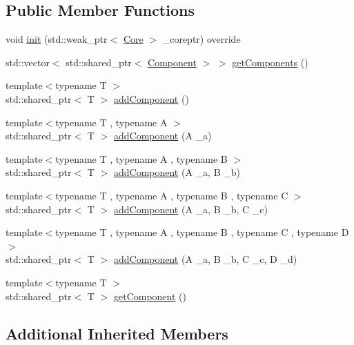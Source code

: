 \subsection*{Public Member Functions}
\begin{DoxyCompactItemize}
\item 
void \hyperlink{classfrontier_1_1_prefab_a6f41f76c2c8484ba9d4451a936f43e42}{init} (std\+::weak\+\_\+ptr$<$ \hyperlink{classfrontier_1_1_core}{Core} $>$ \+\_\+coreptr) override
\item 
std\+::vector$<$ std\+::shared\+\_\+ptr$<$ \hyperlink{classfrontier_1_1_component}{Component} $>$ $>$ \hyperlink{classfrontier_1_1_prefab_a0d857efae6fb692384a6ab0144d66898}{get\+Components} ()
\item 
{\footnotesize template$<$typename T $>$ }\\std\+::shared\+\_\+ptr$<$ T $>$ \hyperlink{classfrontier_1_1_prefab_abcc3288adb9bf3369b6d9f22d54cce1f}{add\+Component} ()
\item 
{\footnotesize template$<$typename T , typename A $>$ }\\std\+::shared\+\_\+ptr$<$ T $>$ \hyperlink{classfrontier_1_1_prefab_aaf0e874502568d298797aabfa631f5c1}{add\+Component} (A \+\_\+a)
\item 
{\footnotesize template$<$typename T , typename A , typename B $>$ }\\std\+::shared\+\_\+ptr$<$ T $>$ \hyperlink{classfrontier_1_1_prefab_a4925e859bce6f80b73f65e363cf192b8}{add\+Component} (A \+\_\+a, B \+\_\+b)
\item 
{\footnotesize template$<$typename T , typename A , typename B , typename C $>$ }\\std\+::shared\+\_\+ptr$<$ T $>$ \hyperlink{classfrontier_1_1_prefab_a11de7e559ff0fd682803ce32cbc5bbc9}{add\+Component} (A \+\_\+a, B \+\_\+b, C \+\_\+c)
\item 
{\footnotesize template$<$typename T , typename A , typename B , typename C , typename D $>$ }\\std\+::shared\+\_\+ptr$<$ T $>$ \hyperlink{classfrontier_1_1_prefab_a08333ffa5f6ea5e9dee3366bb6a98e85}{add\+Component} (A \+\_\+a, B \+\_\+b, C \+\_\+c, D \+\_\+d)
\item 
{\footnotesize template$<$typename T $>$ }\\std\+::shared\+\_\+ptr$<$ T $>$ \hyperlink{classfrontier_1_1_prefab_af9b0194d37a4d02cb6c5a81757e0fb4d}{get\+Component} ()
\end{DoxyCompactItemize}
\subsection*{Additional Inherited Members}


